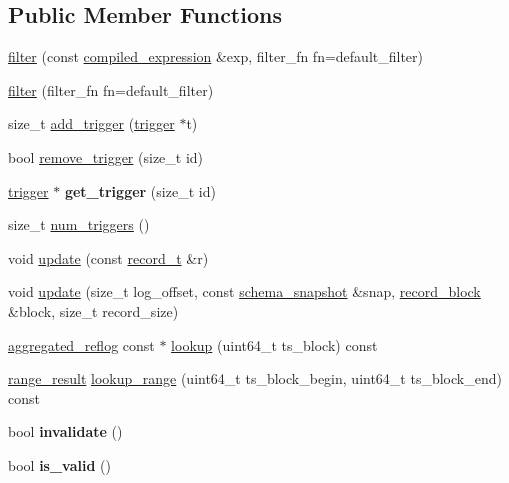 \subsection*{Public Member Functions}
\begin{DoxyCompactItemize}
\item 
\hyperlink{classdialog_1_1monitor_1_1filter_a7fe577f3fc937bef2d62cbcf9c7b6662}{filter} (const \hyperlink{structdialog_1_1compiled__expression}{compiled\+\_\+expression} \&exp, filter\+\_\+fn fn=default\+\_\+filter)
\item 
\hyperlink{classdialog_1_1monitor_1_1filter_a5fa052157aa824765614c7de106a11c2}{filter} (filter\+\_\+fn fn=default\+\_\+filter)
\item 
size\+\_\+t \hyperlink{classdialog_1_1monitor_1_1filter_a6663e4c56880482de42a3366be94356d}{add\+\_\+trigger} (\hyperlink{structdialog_1_1monitor_1_1trigger}{trigger} $\ast$t)
\item 
bool \hyperlink{classdialog_1_1monitor_1_1filter_ac5c01fdc260a434815ab2bbd66ae9ab5}{remove\+\_\+trigger} (size\+\_\+t id)
\item 
\mbox{\label{classdialog_1_1monitor_1_1filter_a8171f52c8ca67d8bc1f0b1fcb2eff525}} 
\hyperlink{structdialog_1_1monitor_1_1trigger}{trigger} $\ast$ {\bfseries get\+\_\+trigger} (size\+\_\+t id)
\item 
size\+\_\+t \hyperlink{classdialog_1_1monitor_1_1filter_aa84bc2df90155d5fd462dce52d86de5c}{num\+\_\+triggers} ()
\item 
void \hyperlink{classdialog_1_1monitor_1_1filter_a9daf4fdb82ff01d211a417e1531461e2}{update} (const \hyperlink{structdialog_1_1record__t}{record\+\_\+t} \&r)
\item 
void \hyperlink{classdialog_1_1monitor_1_1filter_ad0aba175b70f3bf63c4f0f83b5888ccf}{update} (size\+\_\+t log\+\_\+offset, const \hyperlink{classdialog_1_1schema__snapshot}{schema\+\_\+snapshot} \&snap, \hyperlink{structdialog_1_1record__block}{record\+\_\+block} \&block, size\+\_\+t record\+\_\+size)
\item 
\hyperlink{classdialog_1_1aggregated__reflog}{aggregated\+\_\+reflog} const  $\ast$ \hyperlink{classdialog_1_1monitor_1_1filter_a9e112bf3e11d7a02fdb5d49ed51a9827}{lookup} (uint64\+\_\+t ts\+\_\+block) const
\item 
\hyperlink{classflattened__container}{range\+\_\+result} \hyperlink{classdialog_1_1monitor_1_1filter_a5523a17cb88d0f5bd6b78bb16c085632}{lookup\+\_\+range} (uint64\+\_\+t ts\+\_\+block\+\_\+begin, uint64\+\_\+t ts\+\_\+block\+\_\+end) const
\item 
\mbox{\label{classdialog_1_1monitor_1_1filter_a4bbf4488202299895570ce5d7ac9a76f}} 
bool {\bfseries invalidate} ()
\item 
\mbox{\label{classdialog_1_1monitor_1_1filter_a4ab87a27c1e11b14c6a9beca95cbfb36}} 
bool {\bfseries is\+\_\+valid} ()
\end{DoxyCompactItemize}


